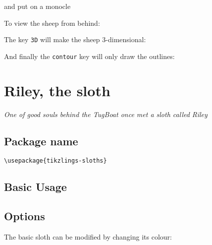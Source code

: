 \documentclass[parskip=half]{scrartcl}
\begin{document}
and put on a monocle
\begin{tcblisting}{}
\sheep[monocle]
\end{tcblisting}

To view the sheep from behind:
\begin{tcblisting}{}
\sheep[back]
\end{tcblisting}

The key \lstinline|3D| will make the sheep 3-dimensional:
\begin{tcblisting}{}
\sheep[3D]
\end{tcblisting}

And finally the \lstinline|contour| key will only draw the outlines:
\begin{tcblisting}{}
\sheep[contour=black]
\end{tcblisting}

%
%
\clearpage
\section[Sloth]{Riley, the sloth}

\emph{One of good souls behind the TugBoat once met a sloth called Riley}

\subsection{Package name}

\begin{tcolorbox}[lower separated=false, lefthand width=.8\linewidth]
\vspace*{0.5cm}
\lstinline|\usepackage{tikzlings-sloths}| 
\vspace*{0.5cm}
\end{tcolorbox}

\subsection{Basic Usage}

\begin{tcblisting}{}
\sloth
\end{tcblisting}

\subsection{Options}

The basic sloth can be modified by changing its colour:
\begin{tcblisting}{}
\sloth[body=blue]
\end{tcblisting}
\end{document}
